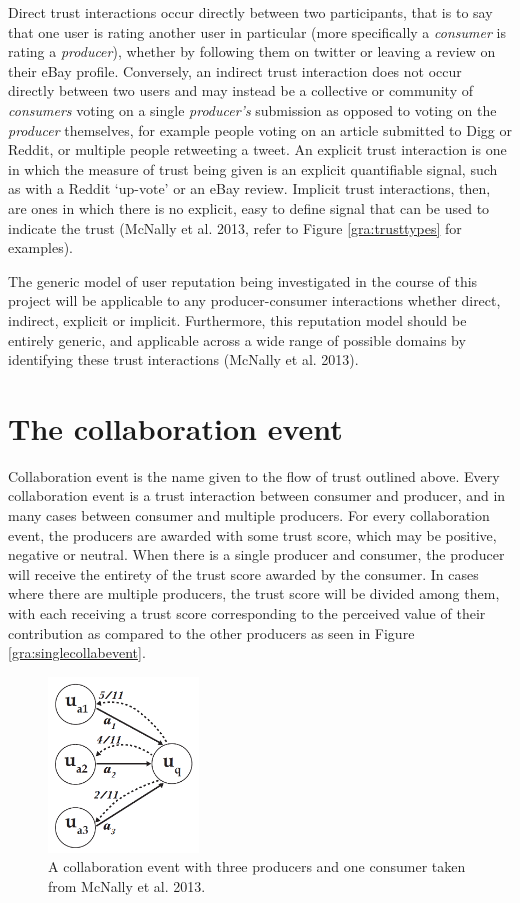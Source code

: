 \documentclass[]{final_report}
\begin{document}
Direct trust interactions occur directly between two participants, that is to say that one user is rating another user in particular (more specifically a \textsl{consumer} is rating a \textsl{producer}), whether by following them on twitter or leaving a review on their eBay profile. Conversely, an indirect trust interaction does not occur directly between two users and may instead be a collective or community of \textsl{consumers} voting on a single \textsl{producer's} submission as opposed to voting on the \textsl{producer} themselves, for example people voting on an article submitted to Digg or Reddit, or multiple people retweeting a tweet. An explicit trust interaction is one in which the measure of trust being given is an explicit quantifiable signal, such as with a Reddit `up-vote' or an eBay review. Implicit trust interactions, then, are ones in which there is no explicit, easy to define signal that can be used to indicate the trust (McNally et al. 2013, refer to Figure \ref{gra:trusttypes} for examples).

The generic model of user reputation being investigated in the course of this project will be applicable to any producer-consumer interactions whether direct, indirect, explicit or implicit. Furthermore, this reputation model should be entirely generic, and applicable across a wide range of possible domains by identifying these trust interactions (McNally et al. 2013).

\section{The collaboration event}

Collaboration event is the name given to the flow of trust outlined above. Every 
collaboration event is a trust interaction between consumer and producer, and in many cases between consumer and multiple producers. For every collaboration event, the producers are awarded with some trust score, which may be positive, negative or neutral. When there is a single producer and consumer, the producer will receive the entirety of the trust score awarded by the consumer. In cases where there are multiple producers, the trust score will be divided among them, with each receiving a trust score corresponding to the perceived value of their contribution as compared to the other producers as seen in Figure \ref{gra:singlecollabevent}.

\begin{figure}[ht!]
\centering
\includegraphics[width=40mm]{chap3/singlecollabevent.PNG}
\caption{A collaboration event with three producers and one consumer taken from McNally et al. 2013.}
\end{figure}\label{gra:singlecollabevent}
\end{document}

